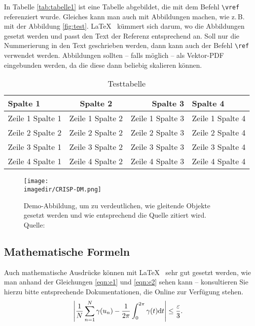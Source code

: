 In Tabelle \vref{tab:tabelle1} ist eine Tabelle abgebildet, die mit dem Befehl \texttt{\textbackslash vref} referenziert wurde. 
Gleiches kann man auch mit Abbildungen machen, wie z.\,B. mit der Abbildung \vref{fig:test}. \LaTeX~ kümmert sich darum, 
wo die Abbildungen gesetzt werden und passt den Text der Referenz entsprechend an. Soll nur die Nummerierung in den Text geschrieben werden, 
dann kann auch der Befehl \texttt{\textbackslash ref} verwendet werden. Abbildungen sollten -- falls möglich -- als Vektor-PDF eingebunden 
werden, da die diese dann beliebig skalieren können.

\lipsum[1]
\begin{table}
	\centering
	\begin{tabular}{p{3cm}crl}
		\textbf{Spalte 1} & \textbf{Spalte 2} & \textbf{Spalte 3} & \textbf{Spalte 4}\\\toprule
		Zeile 1 Spalte 1 &  Zeile 1 Spalte 2 & Zeile 1 Spalte 3 & Zeile 1 Spalte 4\\
		Zeile 2 Spalte 2 &  Zeile 2 Spalte 2 & Zeile 2 Spalte 3 & Zeile 2 Spalte 4\\\midrule
		Zeile 3 Spalte 1 &  Zeile 3 Spalte 2 & Zeile 3 Spalte 3 & Zeile 3 Spalte 4\\
		Zeile 4 Spalte 1 &  Zeile 4 Spalte 2 & Zeile 4 Spalte 3 & Zeile 4 Spalte 4\\\bottomrule
	\end{tabular}
	\caption[Testtabelle]{\label{tab:tabelle1}Testtabelle}
\end{table}

\begin{figure}
	\centering 
	\texttt{[image: \\imagedir/CRISP-DM.png]}
	\captionsetup{format=hang}
	\caption[Optionaler Kurztitel für das Abbildunggsverzeichnis]{\label{fig:test}Demo-Abbildung, um zu verdeutlichen, wie gleitende Objekte 
		gesetzt werden und wie entsprechend die Quelle zitiert wird. \\Quelle: \cite[][S. 223]{TD15}}
\end{figure}
	
\subsection{Mathematische Formeln}
Auch mathematische Ausdrücke können mit \LaTeX~ sehr gut gesetzt werden, wie man anhand der 
Gleichungen \vref{eqn:e1} und \vref{eqn:e2} sehen kann -- konsultieren Sie hierzu bitte entsprechende Dokumentationen, 
die Online zur Verfügung stehen.
\begin{equation}
\left|{1\over N}\sum_{n=1}^N \gamma(u_n)-{1\over 2\pi}\int_0^{2\pi}\gamma(t){\rm d}t\right| \le {\varepsilon\over 3}.\\
\label{eqn:e1}
\end{equation}

